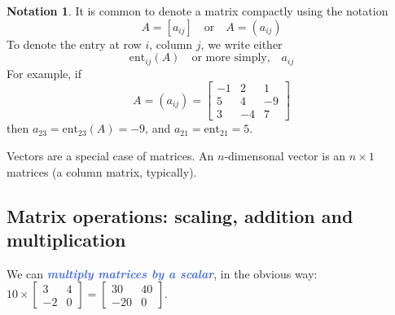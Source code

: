 \documentclass[10pt]{article}
\newcommand{\demph}[1]{\textcolor{RoyalBlue}{\textbf{\slshape #1}}} %
\theoremstyle{definition}
\newtheorem{notation}[theorem]{Notation}
\begin{document}
\begin{notation}
  It is common to denote a matrix compactly using the notation
  \begin{equation*}
    A=[a_{ij}]
    \quad \text{or} \quad
    A=(a_{ij})
  \end{equation*}
  To denote the entry at row $i$, column $j$, we write either
  \begin{equation*}
    \text{ent}_{ij}(A)
    \quad \text{or more simply,} \quad
    a_{ij}
  \end{equation*}
  For example, if
  \begin{equation*}
    A = (a_{ij}) = \begin{bmatrix}
      -1&2&1\\
      5&4&-9\\
      3&-4&7
    \end{bmatrix}
  \end{equation*}
  then $a_{23} = \text{ent}_{23}(A) = -9$, and $a_{21}=\text{ent}_{21}=5$.
\end{notation}

Vectors are a special case of matrices. An $n$-dimensonal vector is an
$n\times 1$ matrices (a column matrix, typically).

\subsection{Matrix operations: scaling, addition and multiplication}
We can \demph{multiply matrices by a scalar}, in the obvious way:
$10\times \begin{bmatrix}
  3&4\\
  -2&0
\end{bmatrix}
=
\begin{bmatrix}
  30&40\\
  -20&0
\end{bmatrix}$.
\end{document}
